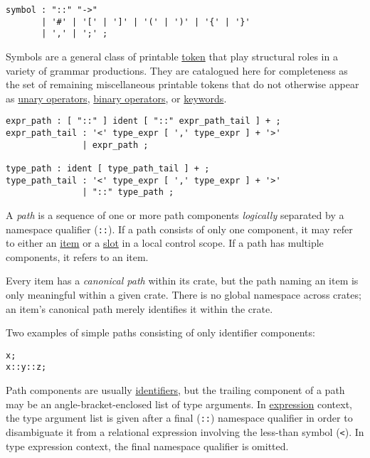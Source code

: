 \documentclass[]{article}
\begin{document}
\begin{verbatim}
symbol : "::" "->"
       | '#' | '[' | ']' | '(' | ')' | '{' | '}'
       | ',' | ';' ;
\end{verbatim}

Symbols are a general class of printable \hyperref[tokens]{token} that
play structural roles in a variety of grammar productions. They are
catalogued here for completeness as the set of remaining miscellaneous
printable tokens that do not otherwise appear as
\hyperref[unary-operator-expressions]{unary operators},
\hyperref[binary-operator-expressions]{binary operators}, or
\hyperref[keywords]{keywords}.


\begin{verbatim}
expr_path : [ "::" ] ident [ "::" expr_path_tail ] + ;
expr_path_tail : '<' type_expr [ ',' type_expr ] + '>'
               | expr_path ;

type_path : ident [ type_path_tail ] + ;
type_path_tail : '<' type_expr [ ',' type_expr ] + '>'
               | "::" type_path ;
\end{verbatim}

A \emph{path} is a sequence of one or more path components
\emph{logically} separated by a namespace qualifier (\texttt{::}). If a
path consists of only one component, it may refer to either an
\hyperref[items]{item} or a \hyperref[memory-slots]{slot} in a local
control scope. If a path has multiple components, it refers to an item.

Every item has a \emph{canonical path} within its crate, but the path
naming an item is only meaningful within a given crate. There is no
global namespace across crates; an item's canonical path merely
identifies it within the crate.

Two examples of simple paths consisting of only identifier components:

\begin{verbatim}
x;
x::y::z;
\end{verbatim}

Path components are usually \hyperref[identifiers]{identifiers}, but the
trailing component of a path may be an angle-bracket-enclosed list of
type arguments. In \hyperref[expressions]{expression} context, the type
argument list is given after a final (\texttt{::}) namespace qualifier
in order to disambiguate it from a relational expression involving the
less-than symbol (\texttt{\textless{}}). In type expression context, the
final namespace qualifier is omitted.
\end{document}

